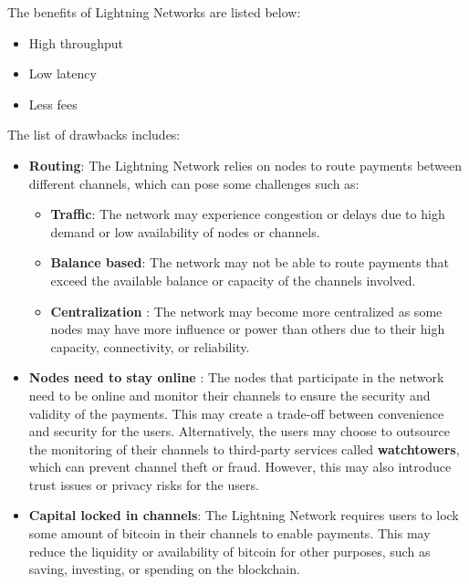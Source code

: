 \documentclass{report}
\begin{document}
The benefits of Lightning Networks are listed below:
\begin{itemize}
	\item High throughput
	\item Low latency
	\item Less fees
\end{itemize}
The list of drawbacks includes:
\begin{itemize}
	\item \textbf{Routing}: The Lightning Network relies on nodes to route payments between different channels, which can pose some challenges such as:
	\begin{itemize}
		\item \textbf{Traffic}: The network may experience congestion or delays due to high demand or low availability of nodes or channels.
		\item \textbf{Balance based}: The network may not be able to route payments that exceed the available balance or capacity of the channels involved.
		\item \textbf{Centralization} : The network may become more centralized as some nodes may have more influence or power than others due to their high capacity, connectivity, or reliability.
	\end{itemize}
	\item \textbf{Nodes need to stay online} : The nodes that participate in the network need to be online and monitor their channels to ensure the security and validity of the payments. This may create a trade-off between convenience and security for the users. Alternatively, the users may choose to outsource the monitoring of their channels to third-party services called \textbf{watchtowers}, which can prevent channel theft or fraud. However, this may also introduce trust issues or privacy risks for the users.
	\item \textbf{Capital locked in channels}: The Lightning Network requires users to lock some amount of bitcoin in their channels to enable payments. This may reduce the liquidity or availability of bitcoin for other purposes, such as saving, investing, or spending on the blockchain.
\end{itemize}
\end{document}
